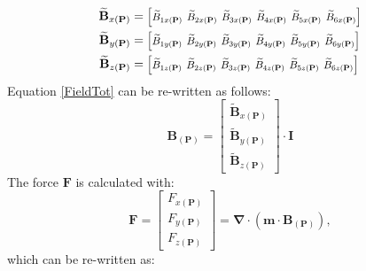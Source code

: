 \begin{align}
\mathbf{\widetilde{B}}_{x(\mathbf{P})}&= \scalebox{.85}{$\setlength\arraycolsep{2pt} \begin{bmatrix}
\widetilde{B}_{1x(\mathbf{P})} & \widetilde{B}_{2x(\mathbf{P})} & \widetilde{B}_{3x(\mathbf{P})} & \widetilde{B}_{4x(\mathbf{P})} & \widetilde{B}_{5x(\mathbf{P})} & \widetilde{B}_{6x(\mathbf{P})}
\end{bmatrix}$}
\label{Gx} \\
%
\mathbf{\widetilde{B}}_{y(\mathbf{P})}&= \scalebox{.85}{$\setlength\arraycolsep{2pt}
\begin{bmatrix}
\widetilde{B}_{1y(\mathbf{P})} & \widetilde{B}_{2y(\mathbf{P})} & \widetilde{B}_{3y(\mathbf{P})} & \widetilde{B}_{4y(\mathbf{P})} & \widetilde{B}_{5y(\mathbf{P})} & \widetilde{B}_{6y(\mathbf{P})}
\end{bmatrix}$}
\label{Gy} \\
%
\mathbf{\widetilde{B}}_{z(\mathbf{P})}&= \scalebox{.85}{$\setlength\arraycolsep{2pt} \begin{bmatrix}
\widetilde{B}_{1z(\mathbf{P})} & \widetilde{B}_{2z(\mathbf{P})} & \widetilde{B}_{3z(\mathbf{P})} & \widetilde{B}_{4z(\mathbf{P})} & \widetilde{B}_{5z(\mathbf{P})} & \widetilde{B}_{6z(\mathbf{P})}
\end{bmatrix}$}
\label{Gz}
\end{align}
%
Equation \ref{FieldTot} can be re-written as follows:
\begin{equation}
\mathbf{B}_{(\mathbf{P})}=\begin{bmatrix}
\mathbf{\widetilde{B}}_{x(\mathbf{P})}
\\
\mathbf{\widetilde{B}}_{y(\mathbf{P})}
\\ 
\mathbf{\widetilde{B}}_{z(\mathbf{P})}
\end{bmatrix}\cdot\mathbf{I}
\end{equation}
%
The force $\mathbf{F}$ is calculated with:
%
\begin{equation}
\mathbf{F}=\begin{bmatrix}
F_{x(\mathbf{P})}
\\ 
F_{y(\mathbf{P})}
\\ 
F_{z(\mathbf{P})}
\end{bmatrix}
=\mathbf{\nabla}\cdot\left ( \mathbf{m}\cdot\mathbf{B}_{(\mathbf{P})} \right ),
\label{Force}
\end{equation}
%
which can be re-written as:
%
